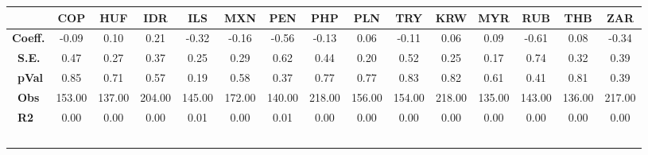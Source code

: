 \begin{tabular}{l|cccccccccccccc}
\hline
&\textbf{COP}&\textbf{HUF}&\textbf{IDR}&\textbf{ILS}&\textbf{MXN}&\textbf{PEN}&\textbf{PHP}&\textbf{PLN}&\textbf{TRY}&\textbf{KRW}&\textbf{MYR}&\textbf{RUB}&\textbf{THB}&\textbf{ZAR}\\\hline
\textbf{Coeff.}&-0.09&0.10&0.21&-0.32&-0.16&-0.56&-0.13&0.06&-0.11&0.06&0.09&-0.61&0.08&-0.34\\\
\textbf{S.E.}&0.47&0.27&0.37&0.25&0.29&0.62&0.44&0.20&0.52&0.25&0.17&0.74&0.32&0.39\\\
\textbf{pVal}&0.85&0.71&0.57&0.19&0.58&0.37&0.77&0.77&0.83&0.82&0.61&0.41&0.81&0.39\\\
\textbf{Obs}&153.00&137.00&204.00&145.00&172.00&140.00&218.00&156.00&154.00&218.00&135.00&143.00&136.00&217.00\\\
\textbf{R2}&0.00&0.00&0.00&0.01&0.00&0.01&0.00&0.00&0.00&0.00&0.00&0.00&0.00&0.00\\\
\end{tabular}
